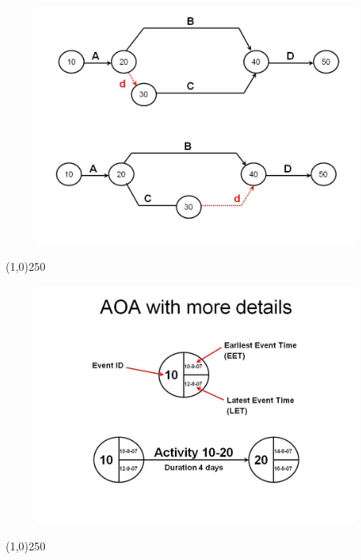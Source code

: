 \begin{frame}
\begin{figure}
	\centering
		\includegraphics[width = 10.5cm]{oldnotes/Slide53.jpg}
\end{figure}
\end{frame}
\begin{center}\line(1,0){250}\end{center}





\begin{frame}
\begin{figure}
	\centering
		\includegraphics[width = 10.5cm]{oldnotes/Slide54.jpg}
\end{figure}
\end{frame}
\begin{center}\line(1,0){250}\end{center}





